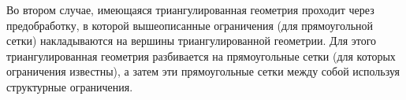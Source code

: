 	Во втором случае, имеющаяся триангулированная геометрия проходит через предобработку, в которой вышеописанные ограничения (для прямоугольной сетки) накладываются на вершины триангулированной геометрии. Для этого триангулированная геометрия разбивается на прямоугольные сетки (для которых ограничения известны), а затем эти прямоугольные сетки  между собой используя структурные ограничения.
	
%
